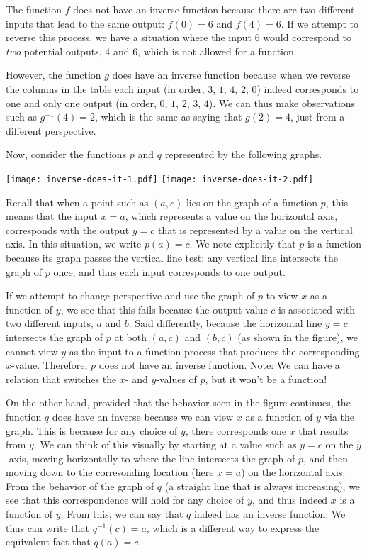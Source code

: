 \documentclass[nooutcomes]{ximera}
\begin{document}
The function $f$ does not have an inverse function because there are two different inputs that lead to the same output:  $f(0) = 6$ and $f(4) = 6$.  If we attempt to reverse this process, we have a situation where the input $6$ would correspond to \emph{two} potential outputs, $4$ and $6$, which is not allowed for a function.

However, the function $g$ does have an inverse function because when we reverse the columns in the table each input (in order, $3$, $1$, $4$, $2$, $0$) indeed corresponds to one and only one output (in order, $0$, $1$, $2$, $3$, $4$).  We can thus make observations such as $g^{-1}(4) = 2$, which is the same as saying that $g(2) = 4$, just from a different perspective.

Now, consider the functions  $p$ and $q$ represented by the following graphs.

\begin{image}
\texttt{[image: inverse-does-it-1.pdf]}
\texttt{[image: inverse-does-it-2.pdf]}
\end{image}

Recall that when a point such as $(a,c)$ lies on the graph of a function $p$, this means that the input $x = a$, which represents a value on the horizontal axis, corresponds with the output $y = c$ that is represented by a value on the vertical axis.  In this situation, we write $p(a) = c$.  We note explicitly that $p$ is a function because its graph passes the vertical line test: any vertical line intersects the graph of $p$ once, and thus each input corresponds to one output.

If we attempt to change perspective and use the graph of $p$ to view $x$ as a function of $y$, we see that this fails because the output value $c$ is associated with two different inputs, $a$ and $b$.  Said differently, because the horizontal line $y = c$ intersects the graph of $p$ at both $(a,c)$ and $(b,c)$ (as shown in the figure), we cannot view $y$ as the input to a function process that produces the corresponding $x$-value.  Therefore, $p$ does not have an inverse function. Note: We can have a relation that switches the $x$- and $y$-values of $p$, but it won't be a function!

On the other hand, provided that the behavior seen in the figure continues, the function $q$ does have an inverse because we can view $x$ as a function of $y$ via the graph.  This is because for any choice of $y$, there corresponds one $x$ that results from $y$.  We can think of this visually by starting at a value such as $y = c$ on the $y$-axis, moving horizontally to where the line intersects the graph of $p$, and then moving down to the corresonding location (here $x = a$) on the horizontal axis.  From the behavior of the graph of $q$ (a straight line that is always increasing), we see that this correspondence will hold for any choice of $y$, and thus indeed $x$ is a function of $y$.  From this, we can say that $q$ indeed has an inverse function.  We thus can write that $q^{-1}(c) = a$, which is a different way to express the equivalent fact that $q(a) = c$.
\end{document}
